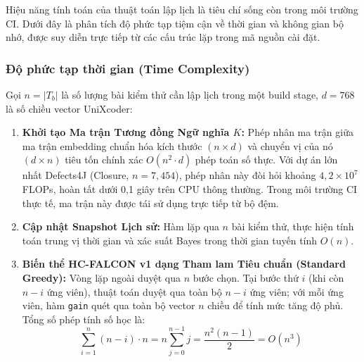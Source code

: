 Hiệu năng tính toán của thuật toán lập lịch là tiêu chí sống còn trong môi trường CI. Dưới đây là phân tích độ phức tạp tiệm cận về thời gian và không gian bộ nhớ, được suy diễn trực tiếp từ các cấu trúc lặp trong mã nguồn cài đặt.

\subsubsection{Độ phức tạp thời gian (Time Complexity)}
\label{subsubsec:time_complexity}

Gọi $n = |T_b|$ là số lượng bài kiểm thử cần lập lịch trong một build stage, $d = 768$ là số chiều vector UniXcoder:
\begin{enumerate}
    \item \textbf{Khởi tạo Ma trận Tương đồng Ngữ nghĩa $K$:}
    Phép nhân ma trận giữa ma trận embedding chuẩn hóa kích thước $(n \times d)$ và chuyển vị của nó $(d \times n)$ tiêu tốn chính xác $O(n^2 \cdot d)$ phép toán số thực. Với dự án lớn nhất Defects4J (Closure, $n = 7{,}454$), phép nhân này đòi hỏi khoảng $4{,}2 \times 10^7$ FLOPs, hoàn tất dưới 0,1 giây trên CPU thông thường. Trong môi trường CI thực tế, ma trận này được tái sử dụng trực tiếp từ bộ đệm.
    
    \item \textbf{Cập nhật Snapshot Lịch sử:}
    Hàm lặp qua $n$ bài kiểm thử, thực hiện tính toán trung vị thời gian và xác suất Bayes trong thời gian tuyến tính $O(n)$.
    
    \item \textbf{Biến thể HC-FALCON v1 dạng Tham lam Tiêu chuẩn (Standard Greedy):}
    Vòng lặp ngoài duyệt qua $n$ bước chọn. Tại bước thứ $i$ (khi còn $n - i$ ứng viên), thuật toán duyệt qua toàn bộ $n - i$ ứng viên; với mỗi ứng viên, hàm \texttt{gain} quét qua toàn bộ vector $n$ chiều để tính mức tăng độ phủ. Tổng số phép tính số học là:
    \begin{equation}
    \sum_{i=1}^n (n - i) \cdot n = n \sum_{j=0}^{n-1} j = \frac{n^2 (n - 1)}{2} = O(n^3)
    \end{equation}
    

\end{enumerate}
